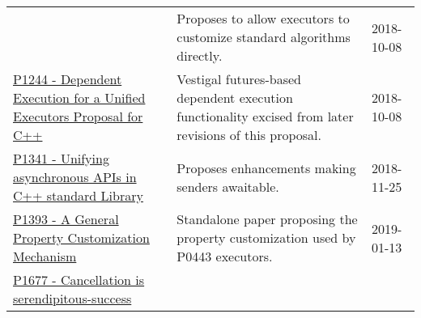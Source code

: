 \documentclass[a4paper,12pt,notitlepage,twoside,openright]{article}
\begin{document}
\begin{longtable}[]{@{}lll@{}}
\begin{minipage}[t]{0.32\columnwidth}
\end{minipage} & \begin{minipage}[t]{0.54\columnwidth}\raggedright
Proposes to allow executors to customize standard algorithms
directly.\strut
\end{minipage} & \begin{minipage}[t]{0.05\columnwidth}\raggedright
2018-10-08\strut
\end{minipage}\tabularnewline
\begin{minipage}[t]{0.32\columnwidth}\raggedright
\href{https://wg21.link/P1244}{P1244 - Dependent Execution for a Unified
Executors Proposal for C++}\strut
\end{minipage} & \begin{minipage}[t]{0.54\columnwidth}\raggedright
Vestigal futures-based dependent execution functionality excised from
later revisions of this proposal.\strut
\end{minipage} & \begin{minipage}[t]{0.05\columnwidth}\raggedright
2018-10-08\strut
\end{minipage}\tabularnewline
\begin{minipage}[t]{0.32\columnwidth}\raggedright
\href{https://wg21.link/P1341}{P1341 - Unifying asynchronous APIs in C++
standard Library}\strut
\end{minipage} & \begin{minipage}[t]{0.54\columnwidth}\raggedright
Proposes enhancements making senders awaitable.\strut
\end{minipage} & \begin{minipage}[t]{0.05\columnwidth}\raggedright
2018-11-25\strut
\end{minipage}\tabularnewline
\begin{minipage}[t]{0.32\columnwidth}\raggedright
\href{https://wg21.link/P1393}{P1393 - A General Property Customization
Mechanism}\strut
\end{minipage} & \begin{minipage}[t]{0.54\columnwidth}\raggedright
Standalone paper proposing the property customization used by P0443
executors.\strut
\end{minipage} & \begin{minipage}[t]{0.05\columnwidth}\raggedright
2019-01-13\strut
\end{minipage}\tabularnewline
\begin{minipage}[t]{0.32\columnwidth}\raggedright
\href{https://wg21.link/P1677}{P1677 - Cancellation is
serendipitous-success}\strut
\end{minipage} & \begin{minipage}[t]{0.54\columnwidth}\raggedright

\end{minipage}
\end{longtable}
\end{document}
